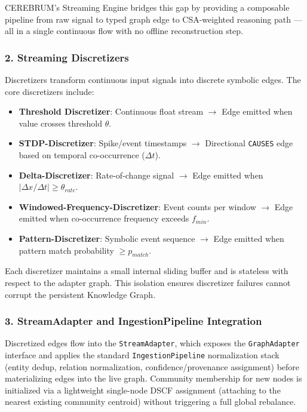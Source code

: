 CEREBRUM's Streaming Engine bridges this gap by providing a composable pipeline from raw signal to typed graph edge to CSA-weighted reasoning path — all in a single continuous flow with no offline recon\-struction step.

\subsubsection{2. Streaming Discre\-tizers}
Discre\-tizers transform continuous input signals into discrete symbolic edges. The core discr\-etizers include:

\begin{itemize}
\item \textbf{Threshold Discretizer}: Continuous float stream $\to$ Edge emitted when value crosses threshold $\theta$.
\item \textbf{STDP-Discretizer}: Spike/event timestamps $\to$ Directional \texttt{CAUSES} edge based on temporal co-occurrence ($\Delta t$).
\item \textbf{Delta-Discretizer}: Rate-of-change signal $\to$ Edge emitted when $|\Delta x / \Delta t| \geq \theta_{rate}$.
\item \textbf{Windowed-Frequency-Discretizer}: Event counts per window $\to$ Edge emitted when co-occurrence frequency exceeds $f_{min}$.
\item \textbf{Pattern-Discretizer}: Symbolic event sequence $\to$ Edge emitted when pattern match probability $\geq p_{match}$.

\end{itemize}
Each discretizer maintains a small internal sliding buffer and is stateless with respect to the adapter graph. This isolation ensures discretizer failures cannot corrupt the persistent Knowledge Graph.

\subsubsection{3. StreamAdapter and IngestionPipeline Integration}
Discretized edges flow into the \texttt{StreamAdapter}, which exposes the \texttt{GraphAdapter} interface and applies the standard \texttt{IngestionPipeline} norma\-lization stack (entity dedup, relation norma\-lization, confidence/provenance assignment) before mater\-ializing edges into the live graph. Community membership for new nodes is initialized via a lightweight single-node DSCF assignment (attaching to the nearest existing community centroid) without triggering a full global rebalance.

